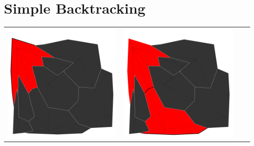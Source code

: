 \documentclass[10pt,a4paper]{article}
\begin{document}
\section{Simple Backtracking}
\begin{tabular}{c c c c }
	\includegraphics[scale=.10]{../results/backtracking_simple/map_build/bt_simple_I00001.pdf}&
	\includegraphics[scale=.10]{../results/backtracking_simple/map_build/bt_simple_I00002.pdf}&

\end{tabular}
\end{document}
